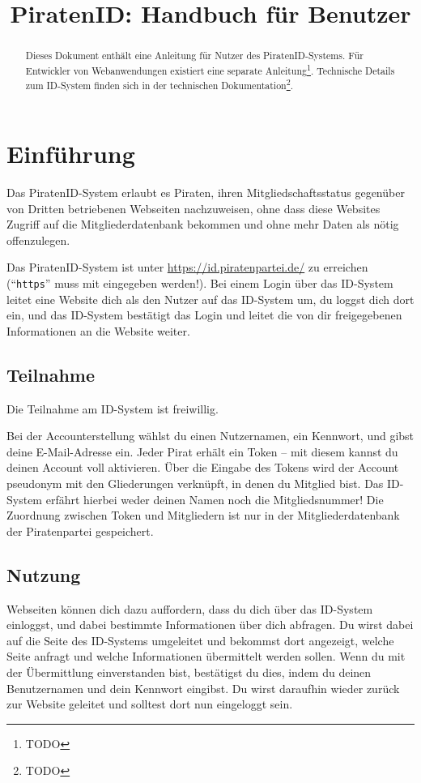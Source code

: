 

\title{PiratenID: Handbuch für Benutzer}


\maketitle

\begin{abstract}\noindent
Dieses Dokument enthält eine Anleitung für Nutzer des PiratenID-Systems.
Für Entwickler von Webanwendungen existiert eine separate Anleitung\footnote{TODO}.
Technische Details zum ID-System finden sich in der technischen Dokumentation\footnote{TODO}.
\end{abstract}


\section{Einführung}
Das PiratenID-System erlaubt es Piraten, ihren Mitgliedschaftsstatus gegenüber von Dritten betriebenen Webseiten nachzuweisen,
ohne dass diese Websites Zugriff auf die Mitgliederdatenbank bekommen und ohne mehr Daten als nötig offenzulegen.

Das PiratenID-System ist unter \url{https://id.piratenpartei.de/} zu erreichen ("`\texttt{https}"' muss mit eingegeben werden!).
Bei einem Login über das ID-System leitet eine Website dich als den Nutzer auf das ID-System um, du loggst dich dort ein,
und das ID-System bestätigt das Login und leitet die von dir freigegebenen Informationen an die Website weiter.

\subsection{Teilnahme}
Die Teilnahme am ID-System ist freiwillig.

Bei der Accounterstellung wählst du einen Nutzernamen, ein Kennwort, und gibst deine E-Mail-Adresse ein.
Jeder Pirat erhält ein Token -- mit diesem kannst du deinen Account voll aktivieren.
Über die Eingabe des Tokens wird der Account pseudonym mit den Gliederungen verknüpft, in denen du Mitglied bist.
Das ID-System erfährt hierbei weder deinen Namen noch die Mitgliedsnummer!
Die Zuordnung zwischen Token und Mitgliedern ist nur in der Mitgliederdatenbank der Piratenpartei gespeichert.

\subsection{Nutzung}
Webseiten können dich dazu auffordern, dass du dich über das ID-System einloggst, und dabei bestimmte Informationen über dich abfragen.
Du wirst dabei auf die Seite des ID-Systems umgeleitet und bekommst dort angezeigt, welche Seite anfragt und welche Informationen übermittelt werden sollen.
Wenn du mit der Übermittlung einverstanden bist, bestätigst du dies, indem du deinen Benutzernamen und dein Kennwort eingibst.
Du wirst daraufhin wieder zurück zur Website geleitet und solltest dort nun eingeloggt sein.

